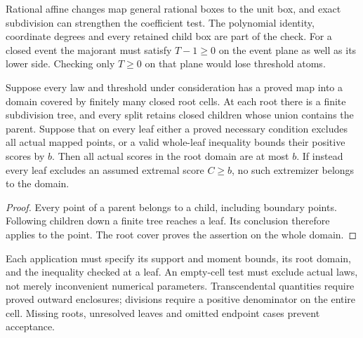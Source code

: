 Rational affine changes map general rational boxes to the unit box,
and exact subdivision can strengthen the coefficient test. The
polynomial identity, coordinate degrees and every retained child box
are part of the check. For a closed event the majorant must satisfy
$T-1\ge0$ on the event plane as well as its lower side. Checking
only $T\ge0$ on that plane would lose threshold atoms.

\begin{proposition}\label{ext:closed-cover}
Suppose every law and threshold under consideration has a proved map
into a domain covered by finitely many closed root cells. At each root
there is a finite subdivision tree, and every split retains closed
children whose union contains the parent. Suppose that on every leaf
either a proved necessary condition excludes all actual mapped points,
or a valid whole-leaf inequality bounds their positive scores by $b$.
Then all actual scores in the root domain are at most $b$.
If instead every leaf excludes an assumed extremal score $C\ge b$,
no such extremizer belongs to the domain.
\end{proposition}
\begin{proof}
Every point of a parent belongs to a child, including boundary points.
Following children down a finite tree reaches a leaf. Its conclusion
therefore applies to the point. The root cover proves the assertion
on the whole domain.
\end{proof}

Each application must specify its support and moment bounds, its root
domain, and the inequality checked at a leaf. An empty-cell test must
exclude actual laws, not merely inconvenient numerical parameters.
Transcendental quantities require proved outward enclosures; divisions
require a positive denominator on the entire cell. Missing roots,
unresolved leaves and omitted endpoint cases prevent acceptance.
